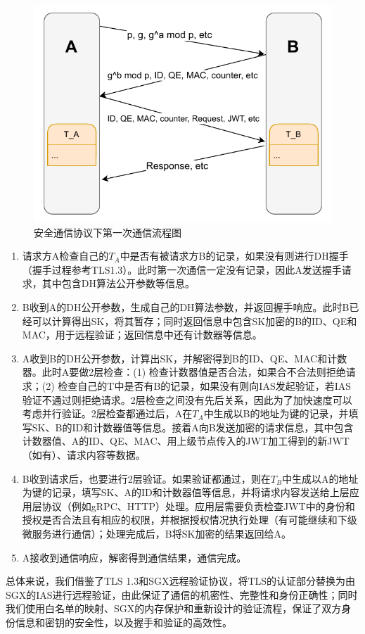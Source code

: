 \begin{figure}[!ht]
    \centering
    \includegraphics[width=.6\textwidth]{figures/communication.pdf}
    \caption{安全通信协议下第一次通信流程图}
    \label{fig:communication}
\end{figure}

\begin{enumerate}
    \item 请求方A检查自己的$T_A$中是否有被请求方B的记录，如果没有则进行DH握手（握手过程参考TLS1.3）。此时第一次通信一定没有记录，因此A发送握手请求，其中包含DH算法公开参数等信息。
    \item B收到A的DH公开参数，生成自己的DH算法参数，并返回握手响应。此时B已经可以计算得出SK，将其暂存；同时返回信息中包含SK加密的B的ID、QE和MAC，用于远程验证；返回信息中还有计数器等信息。
    \item A收到B的DH公开参数，计算出SK，并解密得到B的ID、QE、MAC和计数器。此时A要做2层检查：(1) 检查计数器值是否合法，如果合不合法则拒绝请求；(2) 检查自己的T中是否有B的记录，如果没有则向IAS发起验证，若IAS验证不通过则拒绝请求。2层检查之间没有先后关系，因此为了加快速度可以考虑并行验证。2层检查都通过后，A在$T_A$中生成以B的地址为键的记录，并填写SK、B的ID和计数器值等信息。接着A向B发送加密的请求信息，其中包含计数器值、A的ID、QE、MAC、用上级节点传入的JWT加工得到的新JWT（如有）、请求内容等数据。
    \item B收到请求后，也要进行2层验证。如果验证都通过，则在$T_B$中生成以A的地址为键的记录，填写SK、A的ID和计数器值等信息，并将请求内容发送给上层应用层协议（例如gRPC、HTTP）处理。应用层需要负责检查JWT中的身份和授权是否合法且有相应的权限，并根据授权情况执行处理（有可能继续和下级微服务进行通信）；处理完成后，B将SK加密的结果返回给A。
    \item A接收到通信响应，解密得到通信结果，通信完成。
\end{enumerate}

总体来说，我们借鉴了TLS 1.3和SGX远程验证协议，将TLS的认证部分替换为由SGX的IAS进行远程验证，由此保证了通信的机密性、完整性和身份正确性；同时我们使用白名单的映射、SGX的内存保护和重新设计的验证流程，保证了双方身份信息和密钥的安全性，以及握手和验证的高效性。

